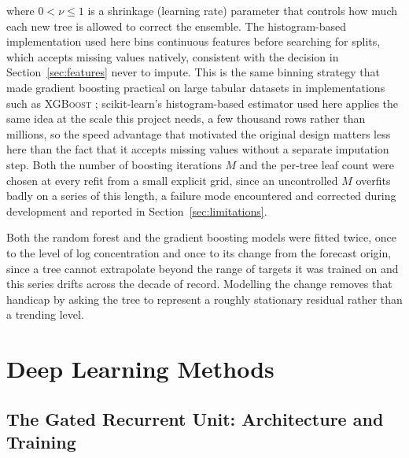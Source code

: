 \documentclass[12pt,a4paper]{report}
\begin{document}
where $0 < \nu \le 1$ is a shrinkage (learning rate) parameter that controls
how much each new tree is allowed to correct the ensemble. The
histogram-based implementation used here bins continuous features before
searching for splits, which accepts missing values natively, consistent with
the decision in Section~\ref{sec:features} never to impute. This is the same
binning strategy that made gradient boosting practical on large tabular
datasets in implementations such as \textsc{XGBoost} \citep{chen2016xgboost};
scikit-learn's histogram-based estimator used here applies the same idea at
the scale this project needs, a few thousand rows rather than millions, so
the speed advantage that motivated the original design matters less here
than the fact that it accepts missing values without a separate imputation
step. Both the number
of boosting iterations $M$ and the per-tree leaf count were chosen at every
refit from a small explicit grid, since an uncontrolled $M$ overfits badly on
a series of this length, a failure mode encountered and corrected during
development and reported in Section~\ref{sec:limitations}.

Both the random forest and the gradient boosting models were fitted twice,
once to the level of log concentration and once to its change from the
forecast origin, since a tree cannot extrapolate beyond the range of targets
it was trained on and this series drifts across the decade of record.
Modelling the change removes that handicap by asking the tree to represent a
roughly stationary residual rather than a trending level.

\section{Deep Learning Methods}
\label{sec:dl-methods}

\subsection{The Gated Recurrent Unit: Architecture and Training}
\label{sec:gru}
\end{document}
